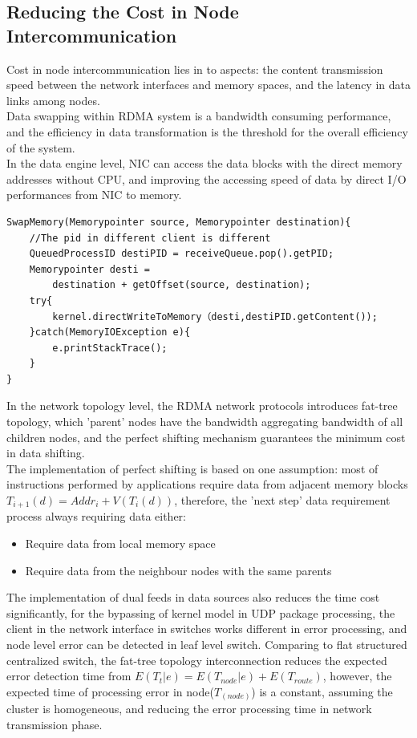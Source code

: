 \documentclass[11pt,openright,a4paper]{report}
\begin{document}
\subsection{Reducing the Cost in Node Intercommunication}
Cost in node intercommunication lies in to aspects: the content transmission speed between the network interfaces and memory spaces, and the latency in data links among nodes.\\
Data swapping within RDMA system is a bandwidth consuming performance, and the efficiency in data transformation is the threshold for the overall efficiency of the system. \\
In the data engine level, NIC can access the data blocks with the direct memory addresses without CPU, and improving the accessing speed of data by direct I/O performances from NIC to memory. 
\begin{lstlisting}[breaklines,breakatwhitespace,caption={Direct Data access from NIC to memory},label=nic-psudoCode]
SwapMemory(Memorypointer source, Memorypointer destination){
	//The pid in different client is different
	QueuedProcessID destiPID = receiveQueue.pop().getPID;
	Memorypointer desti = 
		destination + getOffset(source, destination);
	try{
		kernel.directWriteToMemory（desti,destiPID.getContent());
	}catch(MemoryIOException e){
		e.printStackTrace();
	}  
}
\end{lstlisting}
In the network topology level, the RDMA network protocols introduces fat-tree topology, which 'parent' nodes have the bandwidth aggregating bandwidth of all children nodes, and the perfect shifting mechanism guarantees the minimum cost in data shifting.\\
The implementation of perfect shifting is based on one assumption: most of instructions performed by applications require data from adjacent memory blocks $T_{i+1}(d)=Addr_{i}+V(T_{i}(d))$, therefore, the 'next step' data requirement process always requiring data either:
\begin{itemize}
	\item Require data from local memory space
    \item Require data from the neighbour nodes with the same parents
\end{itemize}
The implementation of dual feeds in data sources also reduces the time cost significantly, for the bypassing of kernel model in UDP package processing, the client in the network interface in switches works different in error processing, and node level error can be detected in leaf level switch. Comparing to flat structured centralized switch, the fat-tree topology interconnection reduces the expected error detection time from $E(T_{t}|e)=E(T_{node}|e)+E(T_{route})$, however, the expected time of processing error in node($T_(node)$) is a constant, assuming the cluster is homogeneous, and reducing the error processing time in network transmission phase.\\
\end{document}
